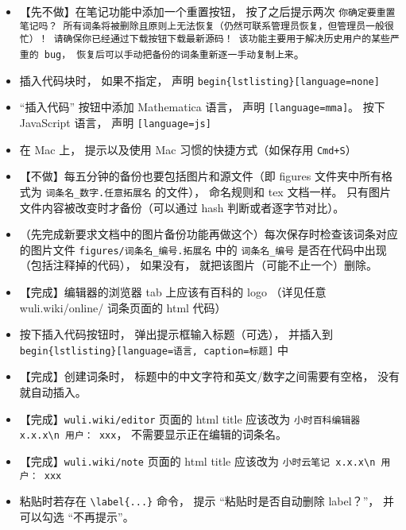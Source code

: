 \begin{itemize}
\item 【先不做】在笔记功能中添加一个重置按钮， 按了之后提示两次 \verb|你确定要重置笔记吗？ 所有词条将被删除且原则上无法恢复（仍然可联系管理员恢复，但管理员一般很忙）！ 请确保你已经通过下载按钮下载最新源码！ 该功能主要用于解决历史用户的某些严重的 bug， 恢复后可以手动把备份的词条重新逐一手动复制上来|。

\item 插入代码块时， 如果不指定， 声明 \verb`begin{lstlisting}[language=none]`

\item “插入代码” 按钮中添加 Mathematica 语言， 声明 \verb`[language=mma]`。 按下 JavaScript 语言， 声明 \verb|[language=js]|

\item 在 Mac 上， 提示以及使用 Mac 习惯的快捷方式（如保存用 \verb|Cmd+S|）

\item 【不做】每五分钟的备份也要包括图片和源文件（即 figures 文件夹中所有格式为 \verb|词条名_数字.任意拓展名| 的文件）， 命名规则和 tex 文档一样。 只有图片文件内容被改变时才备份（可以通过 hash 判断或者逐字节对比）。

\item （先完成新要求文档中的图片备份功能再做这个）每次保存时检查该词条对应的图片文件 \verb|figures/词条名_编号.拓展名| 中的 \verb|词条名_编号| 是否在代码中出现（包括注释掉的代码）， 如果没有， 就把该图片（可能不止一个）删除。

\item 【完成】编辑器的浏览器 tab 上应该有百科的 logo （详见任意 wuli.wiki/online/ 词条页面的 html 代码）

\item 按下插入代码按钮时， 弹出提示框输入标题（可选）， 并插入到 \verb|begin{lstlisting}[language=语言, caption=标题]| 中

\item 【完成】创建词条时， 标题中的中文字符和英文/数字之间需要有空格， 没有就自动插入。

\item 【完成】\verb|wuli.wiki/editor| 页面的 html title 应该改为 \verb|小时百科编辑器 x.x.x\n 用户： xxx|， 不需要显示正在编辑的词条名。

\item 【完成】\verb|wuli.wiki/note| 页面的 html title 应该改为 \verb|小时云笔记 x.x.x\n 用户： xxx|

\item 粘贴时若存在 \verb|\label{...}| 命令， 提示 “粘贴时是否自动删除 label？”， 并可以勾选 “不再提示”。


\end{itemize}
